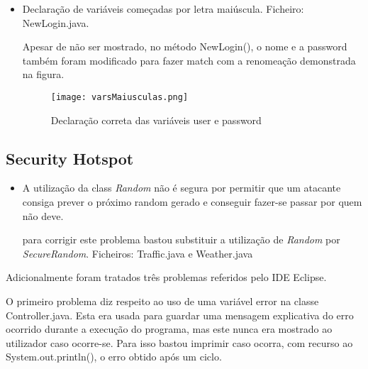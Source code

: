 \begin{itemize}
\item Declaração de variáveis começadas por letra maiúscula. \newline
 Ficheiro: NewLogin.java.\newline

\par Apesar de não ser mostrado, no método NewLogin(), o nome e a password também foram modificado para fazer match com a renomeação demonstrada na figura.

\begin{figure}[H]

  \centering

  \texttt{[image: varsMaiusculas.png]}

  \caption {Declaração correta das variáveis user e password}

  \label {fig27}

\end{figure}

\end{itemize}

\subsection{Security Hotspot}

\begin{itemize}

\item A utilização da class \textit{Random} não é segura por permitir que um atacante consiga prever o próximo random gerado e conseguir fazer-se passar por quem não deve.\newline

\par para corrigir este problema bastou substituir a utilização de \textit{Random} por \textit{SecureRandom}.
Ficheiros: Traffic.java e Weather.java

\end{itemize}

\par Adicionalmente foram tratados três problemas referidos pelo IDE Eclipse.

\par O primeiro problema diz respeito ao uso de uma variável error na classe Controller.java. Esta era usada para guardar uma mensagem explicativa do erro ocorrido durante a execução do programa, mas este nunca era mostrado ao utilizador caso ocorre-se. Para isso bastou imprimir caso ocorra, com recurso ao System.out.println(), o erro obtido após um ciclo.\newline

